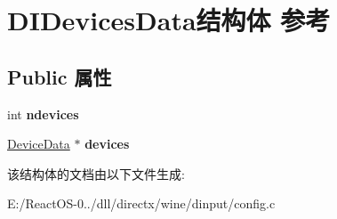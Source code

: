 \hypertarget{struct_d_i_devices_data}{}\section{D\+I\+Devices\+Data结构体 参考}
\label{struct_d_i_devices_data}
\subsection*{Public 属性}
\begin{DoxyCompactItemize}
\item 
\mbox{\label{struct_d_i_devices_data_a7be09d6e006294add831fc4e909e17ab}} 
int {\bfseries ndevices}
\item 
\mbox{\label{struct_d_i_devices_data_ad584b9541c590fe28baae18a6e95673e}} 
\hyperlink{struct_device_data}{Device\+Data} $\ast$ {\bfseries devices}
\end{DoxyCompactItemize}


该结构体的文档由以下文件生成\+:\begin{DoxyCompactItemize}
\item 
E\+:/\+React\+O\+S-\/0../dll/directx/wine/dinput/config.\+c\end{DoxyCompactItemize}
